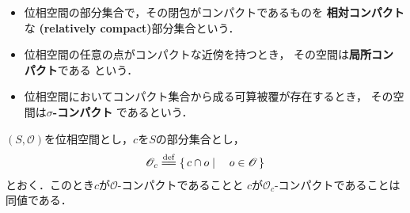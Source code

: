 	\begin{screen}
		\begin{dfn}\mbox{}
			\begin{itemize}
				\item 位相空間の部分集合で，その閉包がコンパクトであるものを
					{\bf 相対コンパクト}な
					{\bf (relatively compact)}部分集合という．
				
				\item 位相空間の任意の点がコンパクトな近傍を持つとき，
					その空間は{\bf 局所コンパクト}である
					という．
					
				\item 位相空間においてコンパクト集合から成る可算被覆が存在するとき，
					その空間は{\bf $\sigma$-コンパクト}
					であるという．
			\end{itemize}
		\end{dfn}
	\end{screen}
	
	\begin{screen}
		\begin{thm}[部分空間におけるコンパクト性]
		\label{thm:subset_is_compact_iff_every_original_open_cover_contains_finite_subcover}
		\label{thm:compactness_in_subspace}
			$(S,\mathscr{O})$を位相空間とし，$c$を$S$の部分集合とし，
			\begin{align}
				\mathscr{O}_{c} \defeq \Set{c \cap o}{o \in \mathscr{O}}
			\end{align}
			とおく．このとき$c$が$\mathscr{O}$-コンパクトであることと
			$c$が$\mathscr{O}_{c}$-コンパクトであることは同値である．
		\end{thm}
	\end{screen}
	

